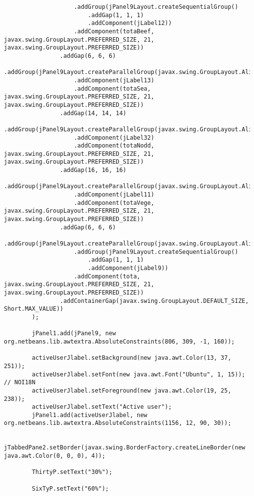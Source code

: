 \documentclass[12pt,a4paper]{article}
\begin{document}
\begin{lstlisting}
                    .addGroup(jPanel9Layout.createSequentialGroup()
                        .addGap(1, 1, 1)
                        .addComponent(jLabel12))
                    .addComponent(totaBeef, javax.swing.GroupLayout.PREFERRED_SIZE, 21, javax.swing.GroupLayout.PREFERRED_SIZE))
                .addGap(6, 6, 6)
                .addGroup(jPanel9Layout.createParallelGroup(javax.swing.GroupLayout.Alignment.LEADING)
                    .addComponent(jLabel13)
                    .addComponent(totaSea, javax.swing.GroupLayout.PREFERRED_SIZE, 21, javax.swing.GroupLayout.PREFERRED_SIZE))
                .addGap(14, 14, 14)
                .addGroup(jPanel9Layout.createParallelGroup(javax.swing.GroupLayout.Alignment.BASELINE)
                    .addComponent(jLabel32)
                    .addComponent(totaNodd, javax.swing.GroupLayout.PREFERRED_SIZE, 21, javax.swing.GroupLayout.PREFERRED_SIZE))
                .addGap(16, 16, 16)
                .addGroup(jPanel9Layout.createParallelGroup(javax.swing.GroupLayout.Alignment.LEADING)
                    .addComponent(jLabel11)
                    .addComponent(totaVege, javax.swing.GroupLayout.PREFERRED_SIZE, 21, javax.swing.GroupLayout.PREFERRED_SIZE))
                .addGap(6, 6, 6)
                .addGroup(jPanel9Layout.createParallelGroup(javax.swing.GroupLayout.Alignment.LEADING)
                    .addGroup(jPanel9Layout.createSequentialGroup()
                        .addGap(1, 1, 1)
                        .addComponent(jLabel9))
                    .addComponent(tota, javax.swing.GroupLayout.PREFERRED_SIZE, 21, javax.swing.GroupLayout.PREFERRED_SIZE))
                .addContainerGap(javax.swing.GroupLayout.DEFAULT_SIZE, Short.MAX_VALUE))
        );

        jPanel1.add(jPanel9, new org.netbeans.lib.awtextra.AbsoluteConstraints(806, 309, -1, 160));

        activeUserJlabel.setBackground(new java.awt.Color(13, 37, 251));
        activeUserJlabel.setFont(new java.awt.Font("Ubuntu", 1, 15)); // NOI18N
        activeUserJlabel.setForeground(new java.awt.Color(19, 25, 238));
        activeUserJlabel.setText("Active user");
        jPanel1.add(activeUserJlabel, new org.netbeans.lib.awtextra.AbsoluteConstraints(1156, 12, 90, 30));

        jTabbedPane2.setBorder(javax.swing.BorderFactory.createLineBorder(new java.awt.Color(0, 0, 0), 4));

        ThirtyP.setText("30%");

        SixTyP.setText("60%");


\end{lstlisting}
\end{document}
